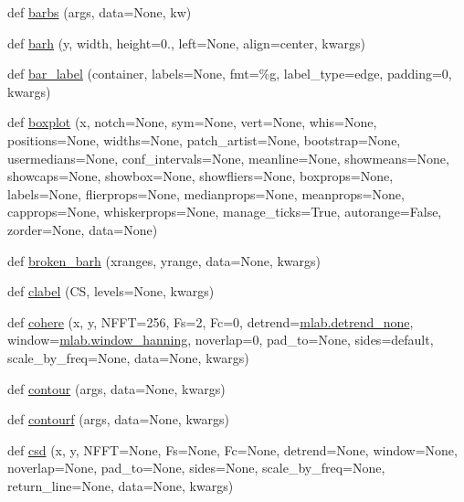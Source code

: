 \begin{DoxyCompactItemize}
\item 
def \hyperlink{namespacematplotlib_1_1pyplot_a237a6a210f5ee2eb98d2a1f93060e43e}{barbs} (args, data=None, kw)
\item 
def \hyperlink{namespacematplotlib_1_1pyplot_a8527e839720a7ade4ef750b203bb6209}{barh} (y, width, height=0., left=None, align=\textquotesingle{}center\textquotesingle{}, kwargs)
\item 
def \hyperlink{namespacematplotlib_1_1pyplot_adbff993fd62a231ff4fbe87f1857e442}{bar\+\_\+label} (container, labels=None, fmt=\textquotesingle{}\%g\textquotesingle{}, label\+\_\+type=\textquotesingle{}edge\textquotesingle{}, padding=0, kwargs)
\item 
def \hyperlink{namespacematplotlib_1_1pyplot_a2eb6699379c1b50a38619452740bd78c}{boxplot} (x, notch=None, sym=None, vert=None, whis=None, positions=None, widths=None, patch\+\_\+artist=None, bootstrap=None, usermedians=None, conf\+\_\+intervals=None, meanline=None, showmeans=None, showcaps=None, showbox=None, showfliers=None, boxprops=None, labels=None, flierprops=None, medianprops=None, meanprops=None, capprops=None, whiskerprops=None, manage\+\_\+ticks=True, autorange=False, zorder=None, data=None)
\item 
def \hyperlink{namespacematplotlib_1_1pyplot_a320464f6a10552adc04fb182b991ee75}{broken\+\_\+barh} (xranges, yrange, data=None, kwargs)
\item 
def \hyperlink{namespacematplotlib_1_1pyplot_aa25b9f9a34785195c70fee1a330476c2}{clabel} (CS, levels=None, kwargs)
\item 
def \hyperlink{namespacematplotlib_1_1pyplot_a3b6975fc698226c2cd6e2be4c29a9558}{cohere} (x, y, N\+F\+FT=256, Fs=2, Fc=0, detrend=\hyperlink{namespacematplotlib_1_1mlab_a359979aa8e0e635738648ca88ebd5e1d}{mlab.\+detrend\+\_\+none}, window=\hyperlink{namespacematplotlib_1_1mlab_a0be4c7ab27102a4d8ceb0a08a32ac0fc}{mlab.\+window\+\_\+hanning}, noverlap=0, pad\+\_\+to=None, sides=\textquotesingle{}default\textquotesingle{}, scale\+\_\+by\+\_\+freq=None, data=None, kwargs)
\item 
def \hyperlink{namespacematplotlib_1_1pyplot_aad03a91ca4a47b4c9748f1fcd6fed428}{contour} (args, data=None, kwargs)
\item 
def \hyperlink{namespacematplotlib_1_1pyplot_a8766395d1c09463e985f6ee8fa57269c}{contourf} (args, data=None, kwargs)
\item 
def \hyperlink{namespacematplotlib_1_1pyplot_aa0056d23acae30f6dad62cc213ed6842}{csd} (x, y, N\+F\+FT=None, Fs=None, Fc=None, detrend=None, window=None, noverlap=None, pad\+\_\+to=None, sides=None, scale\+\_\+by\+\_\+freq=None, return\+\_\+line=None, data=None, kwargs)

\end{DoxyCompactItemize}
